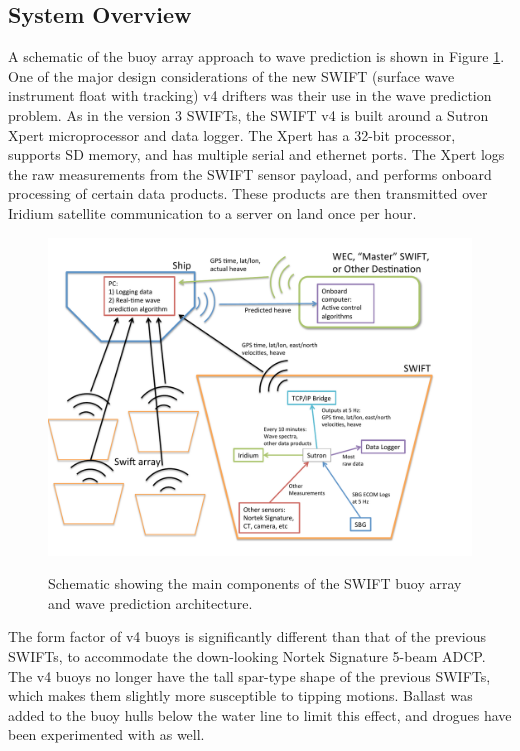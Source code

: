 \documentclass[11pt]{article}
\begin{document}
\subsection{System Overview}

A schematic of the buoy array approach to wave prediction is shown in Figure \ref{fig:WavePredictionSchematic}.  One of the major design considerations of the new SWIFT (surface wave instrument float with tracking) v4 drifters was their use in the wave prediction problem.  As in the version 3 SWIFTs, the SWIFT v4 is built around a Sutron Xpert microprocessor and data logger.  The Xpert has a 32-bit processor, supports SD memory, and has multiple serial and ethernet ports.  The Xpert logs the raw measurements from the SWIFT sensor payload, and performs onboard processing of certain data products.  These products are then transmitted over Iridium satellite communication to a server on land once per hour.

\begin{figure}[t]
    \centering
    \noindent\includegraphics[width=5.5in]{WavePredictionSchematic.pdf}\\
   \vspace{-0in}\caption{Schematic showing the main components of the SWIFT buoy array and wave prediction architecture.}\label{fig:WavePredictionSchematic}
\end{figure}

The form factor of v4 buoys is significantly different than that of the previous SWIFTs, to accommodate the down-looking Nortek Signature 5-beam ADCP.  The v4 buoys no longer have the tall spar-type shape of the previous SWIFTs, which makes them slightly more susceptible to tipping motions.  Ballast was added to the buoy hulls below the water line to limit this effect, and drogues have been experimented with as well.  
\end{document}
